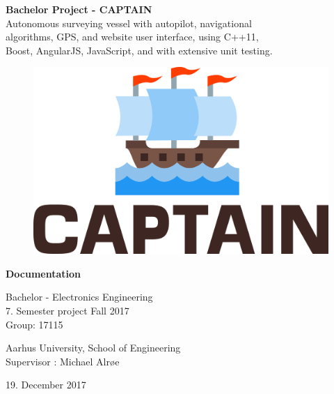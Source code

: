 \begin{titlingpage}
		
	\begin{center}
		{\huge\bfseries Bachelor Project - CAPTAIN}\\
		\vspace{20pt}
		{\large Autonomous surveying vessel with autopilot, navigational\\ algorithms, GPS, and website user interface, using C++11, \\ Boost, AngularJS, JavaScript, and with extensive unit testing.}\\
		
		\vfill
		\begin{figure}[H]
			\centering
			\includegraphics[max width=0.7\linewidth]{Images/logo.png}
		\end{figure}
		
		\vfill
		{\Huge\bfseries Documentation}\\
		
		
		\vspace{20pt}
		
		{Bachelor - Electronics Engineering}\\
		{\large 7. Semester project Fall 2017}\\
		{Group: 17115}\\
		
		\vspace{10pt}
		
		Aarhus University, School of Engineering\\
		Supervisor : Michael Alrøe
		\vspace{10pt}
		
		19. December 2017
		

\end{center}
\end{titlingpage}
